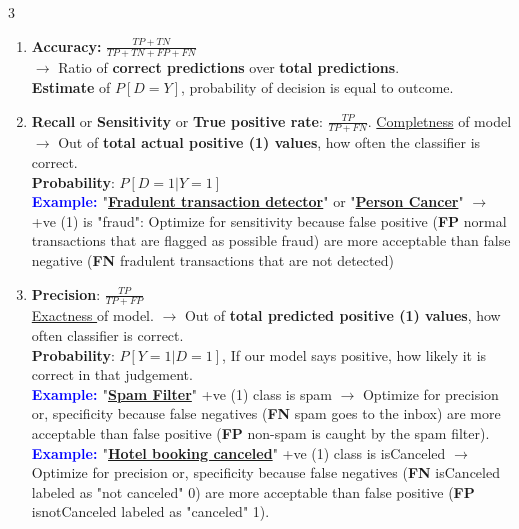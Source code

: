 \documentclass[letterpaper, 10.5pt,landscape]{article}
\begin{document}
\begin{multicols*}{3}
\begin{enumerate}[leftmargin=4mm]
    \item \textbf{Accuracy: } $\boxed{\frac{TP + TN}{TP + TN + FP + FN}}$ \\
    $\rightarrow$ Ratio of \textbf{correct predictions} over \textbf{total predictions}. \\
    \textbf{Estimate} of $\boxed{P[D=Y]}$,  probability of decision is equal to outcome.
    \vspace{-3pt}
    \item \textbf{Recall} or \textbf{Sensitivity} or \textbf{True positive rate}: $\boxed{\frac{TP}{TP+FN}}$.  \underline{Completness} of model $\rightarrow$ Out of \textbf{total actual positive (1) values}, how often the classifier is correct. \\
    \textbf{Probability}: $\boxed{P[D=1 | Y=1]}$ \\
    \textbf{\textcolor{blue}{Example: }} "\underline{\textbf{Fradulent transaction detector}}" or "\underline{\textbf{Person Cancer}}" $\rightarrow$ +ve (1) is "fraud": Optimize for sensitivity because false positive (\textbf{FP} normal transactions that are flagged as possible fraud) are more acceptable than false negative (\textbf{FN} fradulent transactions that are not detected) 
    \vspace{-2pt}

    \item \textbf{Precision}: $\boxed{\frac{TP}{TP+FP}}$ \\
    \underline{Exactness } of model. $\rightarrow$ Out of \textbf{total predicted positive (1) values}, how often classifier is correct. \\ \textbf{Probability}: $\boxed{P[Y=1 | D=1]}$, If our model says positive, how likely it is correct in that judgement.\\
    \textbf{\textcolor{blue}{Example: }} "\underline{\textbf{Spam Filter}}" +ve (1) class is spam $\rightarrow$ Optimize for precision or, specificity because false negatives (\textbf{FN} spam goes to the inbox) are more acceptable than false positive (\textbf{FP} non-spam is caught by the spam filter).
    \textbf{\textcolor{blue}{Example: }} "\underline{\textbf{Hotel booking canceled}}" +ve (1) class is isCanceled $\rightarrow$ Optimize for precision or, specificity because false negatives (\textbf{FN} isCanceled labeled as "not canceled" 0) are more acceptable than false positive (\textbf{FP} isnotCanceled labeled as "canceled" 1).
    \vspace{-2pt}


\end{enumerate}
\end{multicols*}
\end{document}
